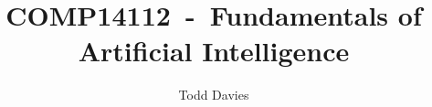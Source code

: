 \newcommand{\coursename}{Fundamentals of Artificial Intelligence}
\newcommand{\coursecode}{COMP14112}
\newcommand{\courseinfo}{}
\newcommand{\Author}{Todd Davies} 
\newcommand{\Title}{\coursecode~-~\coursename}
\author{\Author}
\title{\Title}
